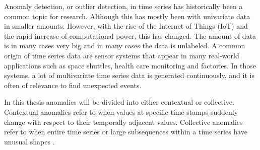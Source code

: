 Anomaly detection, or outlier detection, in time series has historically been a common topic for research. Although this has mostly been with univariate data in smaller amounts. However, with the rise of the Internet of Things (IoT) and the rapid increase of computational power, this has changed. The amount of data is in many cases very big and in many cases the data is unlabeled.   A common origin of time series data are sensor systems that appear in many real-world applications such as space shuttles, health care monitoring and factories. In those systems, a lot of multivariate time series data is generated continuously, and it is often of relevance to find unexpected events. \cite{Malhotra2016a}


In this thesis anomalies will be divided into either contextual or collective. Contextual anomalies refer to when values at specific time stamps suddenly change with respect to their temporally adjacent values. Collective anomalies refer to when entire time series or large subsequences within a time series have unusual shapes \cite{Aggarwal2013a}.